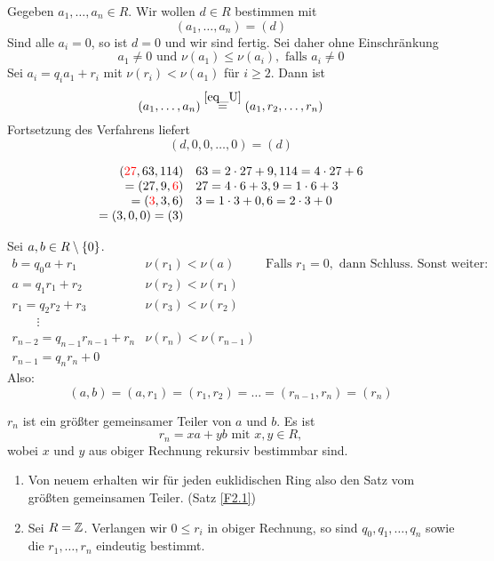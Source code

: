 	Gegeben $a_1,\dots,a_n \in R$. Wir wollen $d \in R$ bestimmen mit 
	\[ (a_1,\dots,a_n) = (d) \]
	Sind alle $a_i = 0$, so ist $d = 0$ und wir sind fertig. Sei daher ohne Einschränkung
	\[ a_1 \neq 0 \text{ und } \nu(a_1) \leq \nu(a_i), \text{ falls } a_i \neq 0 \]
	Sei $a_i = q_ia_1 + r_i$ mit $\nu(r_i) < \nu(a_1)$ für $i \geq 2$. Dann ist
	\[ (a_1,\dots,a_n) \stackrel{\eqref{eq_U}}{=} (a_1,r_2,\dots,r_n) \]
	Fortsetzung des Verfahrens liefert
	\[ (d,0,0,\dots,0) = (d) \]
	
	\[\begin{array}{rl}
		(\textcolor{red}{27},63,114) & 63 = 2 \cdot 27 + 9, 114 = 4 \cdot 27 + 6 \\ 
		= (27,9,\textcolor{red}{6}) & 27 = 4 \cdot 6 + 3, 9 = 1 \cdot 6 + 3 \\ 
		= (\textcolor{red}{3},3,6) & 3 = 1 \cdot 3 + 0, 6 = 2 \cdot 3 + 0 \\ 
		= (3, 0, 0) = (3) & 
	\end{array}\]

	Sei $a,b \in R \setminus \{0\}$. 
	\[\begin{array}{lll}
		b = q_0 a + r_1 & \nu(r_1) < \nu(a) & \text{Falls } r_1 = 0, \text{ dann Schluss. Sonst weiter:} \\ 
		a = q_1 r_1 + r_2 & \nu(r_2) < \nu(r_1) &  \\ 
		r_1 = q_2 r_2 + r_3 & \nu(r_3) < \nu(r_2) &  \\ 
		\qquad \vdots &  &  \\ 
		r_{n-2} = q_{n-1} r_{n-1} + r_n & \nu(r_n) < \nu(r_{n-1}) &  \\ 
		r_{n-1} = q_n r_n + 0 &  & 
	\end{array} \]
	Also:
	\[ (a,b) = (a,r_1) = (r_1,r_2) = \dots = (r_{n-1},r_n) = (r_n) \]
	
\begin{falko} \label{F2.5}
	$r_n$ ist ein größter gemeinsamer Teiler von $a$ und $b$. Es ist
	\[ r_n = xa + yb \text{ mit } x,y \in R, \]
	wobei $x$ und $y$ aus obiger Rechnung rekursiv bestimmbar sind.
\end{falko}

\begin{enumerate}[1)]
	\item Von neuem erhalten wir für jeden euklidischen Ring also den Satz vom größten gemeinsamen Teiler. (Satz \ref{F2.1})
	\item Sei $R = \mathbb{Z}$. Verlangen wir $0 \leq r_i$ in obiger Rechnung, so sind $q_0,q_1,\dots,q_n$ sowie die $r_1,\dots,r_n$ eindeutig bestimmt.
\end{enumerate}

